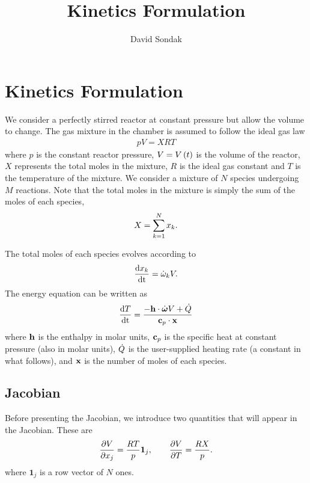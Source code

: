 \documentclass[fontsize=12pt, %
               paper=a4, %
               hyperref]{report}
\begin{document}
\title{\textcolor{titleblue}{Kinetics Formulation} \\[1cm]}

\author{David Sondak}
\date{} %

\maketitle %

\newpage %

\pagestyle{scrheadings} %

\section{Kinetics Formulation}
We consider a perfectly stirred reactor at constant pressure but 
allow the volume to change.  The gas mixture in the chamber 
is assumed to follow the ideal gas law 
\begin{align}
  pV = X R T \label{eq:ideal_gas_law}
\end{align}
where $p$ is the constant reactor pressure, $V = V\left(t\right)$ is 
the volume of the reactor, $X$ represents the total moles in 
the mixture, $R$ is the ideal gas constant and $T$ is the 
temperature of the mixture.  We consider a mixture of $N$ 
species undergoing $M$ reactions.  Note that the total 
moles in the mixture is simply the sum of the moles of each 
species, 
\begin{align}
  X = \sum_{k=1}^{N}{x_{k}}.
\end{align}

The total moles of each species evolves according to 
\begin{align}
  \frac{\mathrm{d} x_{k}}{\mathrm{d} \mathrm{t}} = \dot{\omega}_{k}V.
\end{align}
The energy equation can be written as 
\begin{align}
  \frac{\mathrm{d} T}{\mathrm{d} \mathrm{t}} = \frac{-\mathbf{h}\cdot\dot{\boldsymbol{\omega}} V + \dot{Q}}{\mathbf{c}_{p}\cdot\mathbf{x}}
\end{align}
where $\mathbf{h}$ is the enthalpy in molar units, $\mathbf{c}_{p}$ is the specific 
heat at constant pressure (also in molar units), $\dot{Q}$ 
is the user-supplied heating rate (a constant in what follows), 
and $\mathbf{x}$ is the number of moles of each species. 

\subsection{Jacobian}
Before presenting the Jacobian, we introduce two quantities 
that will appear in the Jacobian.  These are 
\begin{align}
  \frac{\partial V}{\partial x_{j}} = \frac{R T}{p}\mathbf{1}_{j}, \qquad 
  \frac{\partial V}{\partial T} = \frac{R X}{p}.
\end{align}
where $\mathbf{1}_{j}$ is a row vector of $N$ ones.
\end{document}
